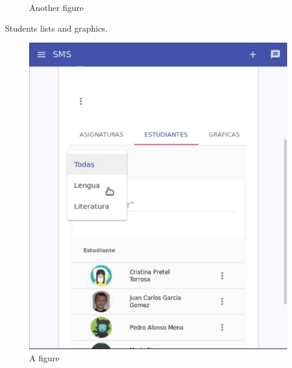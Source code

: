 \begin{figure}[H]
\begin{minipage}{.5\textwidth}
  \caption{Another figure}
\end{minipage}
\end{figure}

\noindent Students lists and graphics.

\begin{figure}[H]
\centering
\begin{minipage}{.5\textwidth}
  \centering
  \includegraphics[scale=0.3]{img/snaps/teacher_profile_students.png}
  \caption{A figure}
\end{minipage}%
\begin{minipage}{.5\textwidth}
  \centering

\end{minipage}
\end{figure}
